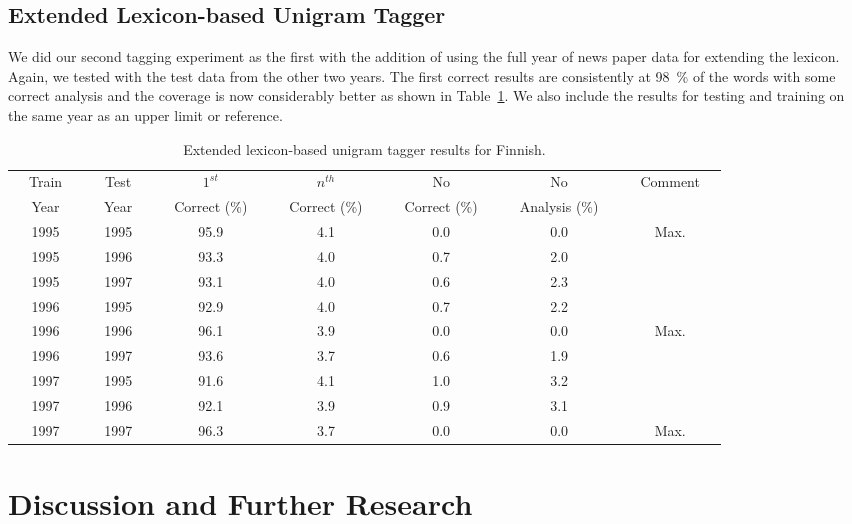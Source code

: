 \documentclass[postprint]{flammie}
\begin{document}
\subsection{Extended Lexicon-based Unigram Tagger}

We did our second tagging experiment as the first with the addition of
using the full year of news paper data for extending the lexicon.
Again, we tested with the test data from the other two years. The
first correct results are consistently at 98~\% of the words with some
correct analysis and the coverage is now considerably better as shown
in Table~\ref{tab:taggerresults2}. We also include the results for
testing and training on the same year as an upper limit or reference.

\begin{table}[h!]
  \centering
  \caption{Extended lexicon-based unigram tagger results for Finnish.
  }\label{tab:taggerresults2}
  \begin{scriptsize}
    \begin{tabular}{c|c|c|c|c|c|c}
      \hline
      ~~Train~~ & ~~Test~~ & ~~$1^{st}$~~& ~~$n^{th}$~~ & ~~No~~ & ~~No~~ & ~~Comment~~\\
      ~~Year~~ & ~~Year~~ & ~~Correct (\%)~~ & ~~Correct (\%)~~ & ~~Correct (\%)~~ & ~~Analysis (\%)~~ \\
      \hline 
      1995 & 1995 & 95.9 & 4.1 & 0.0 & 0.0 & ~~Max.~~\\
      1995 & 1996 & 93.3 & 4.0 & 0.7 & 2.0 & \\
      1995 & 1997 & 93.1 & 4.0 & 0.6 & 2.3 & \\
      \hline 
      1996 & 1995 & 92.9 & 4.0 & 0.7 & 2.2 & \\
      1996 & 1996 & 96.1 & 3.9 & 0.0 & 0.0 & ~~Max.~~\\
      1996 & 1997 & 93.6 & 3.7 & 0.6 & 1.9 & \\
      \hline 
      1997 & 1995 & 91.6 & 4.1 & 1.0 & 3.2 & \\
      1997 & 1996 & 92.1 & 3.9 & 0.9 & 3.1 & \\
      1997 & 1997 & 96.3 & 3.7 & 0.0 & 0.0 & ~~Max.~~\\
      \hline 
    \end{tabular}
  \end{scriptsize}
\end{table}

\section{Discussion and Further Research}
\label{Sect7}
\end{document}
